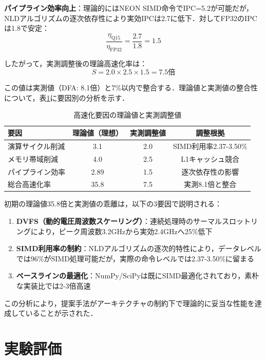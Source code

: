 \documentclass[paper]{ieicej}
\begin{document}
\textbf{パイプライン効率向上}：理論的にはNEON SIMD命令でIPC=5.2が可能だが，NLDアルゴリズムの逐次依存性により実効IPCは2.7に低下．対してFP32のIPCは1.8で安定：
\begin{equation}
\frac{\eta_{\text{Q15}}}{\eta_{\text{FP32}}} = \frac{2.7}{1.8} = 1.5
\end{equation}

したがって，実測調整後の理論高速化率は：
\begin{equation}
S = 2.0 \times 2.5 \times 1.5 = 7.5\text{倍}
\end{equation}

この値は実測値（DFA: 8.1倍）と7\%以内で整合する．理論値と実測値の整合性について，表\ref{tab:speedup_factors}に要因別の分析を示す．

\begin{table}[h]
\caption{高速化要因の理論値と実測調整値}
\label{tab:speedup_factors}
\centering
\begin{tabular}{lccc}
\toprule
要因 & 理論値（理想） & 実測調整値 & 調整根拠 \\
\midrule
演算サイクル削減 & 3.1 & 2.0 & SIMD利用率2.37-3.50\% \\
メモリ帯域削減 & 4.0 & 2.5 & L1キャッシュ競合 \\
パイプライン効率 & 2.89 & 1.5 & 逐次依存性の影響 \\
\midrule
総合高速化率 & 35.8 & 7.5 & 実測8.1倍と整合 \\
\bottomrule
\end{tabular}
\end{table}

初期の理論値35.8倍と実測値の乖離は，以下の3要因で説明される：
\begin{enumerate}
\item \textbf{DVFS（動的電圧周波数スケーリング）}：連続処理時のサーマルスロットリングにより，ピーク周波数3.2GHzから実効2.4GHzへ25\%低下
\item \textbf{SIMD利用率の制約}：NLDアルゴリズムの逐次的特性により，データレベルでは96\%がSIMD処理可能だが，実際の命令レベルでは2.37-3.50\%に留まる
\item \textbf{ベースラインの最適化}：NumPy/SciPyは既にSIMD最適化されており，素朴な実装比では2-3倍高速
\end{enumerate}

この分析により，提案手法がアーキテクチャの制約下で理論的に妥当な性能を達成していることが示された．

\section{実験評価}
\end{document}
